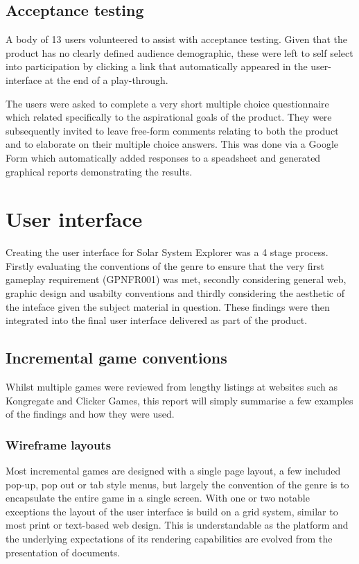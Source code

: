\documentclass[twoside]{bhamthesis}
\begin{document}
\subsection{Acceptance testing}

A body of 13 users volunteered to assist with acceptance testing. Given that the product has no clearly defined audience demographic, these were left to self select into participation by clicking a link that automatically appeared in the user-interface at the end of a play-through.

The users were asked to complete a very short multiple choice questionnaire which related specifically to the aspirational goals of the product. They were subsequently invited to leave free-form comments relating to both the product and to elaborate on their multiple choice answers. This was done via a Google Form which automatically added responses to a speadsheet and generated graphical reports demonstrating the results.

\section{User interface}

Creating the user interface for Solar System Explorer was a 4 stage process. Firstly evaluating the conventions of the genre to ensure that the very first gameplay requirement (GPNFR001) was met, secondly considering general web, graphic design and usabilty conventions and thirdly considering the aesthetic of the inteface given the subject material in question. These findings were then integrated into the final user interface delivered as part of the product.

\subsection{Incremental game conventions}

Whilst multiple games were reviewed from lengthy listings at websites such as Kongregate and Clicker Games, this report will simply summarise a few examples of the findings and how they were used.

\subsubsection{Wireframe layouts}

Most incremental games are designed with a single page layout, a few included pop-up, pop out or tab style menus, but largely the convention of the genre is to encapsulate the entire game in a single screen. With one or two notable exceptions the layout of the user interface is build on a grid system, similar to most print or text-based web design. This is understandable as the platform and the underlying expectations of its rendering capabilities are evolved from the presentation of documents.
\end{document}

